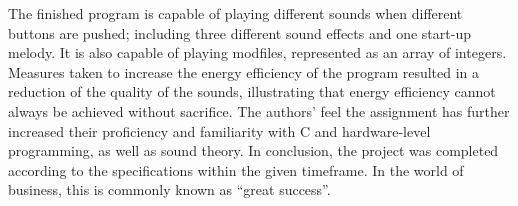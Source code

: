 The finished program is capable of playing different sounds when different buttons are pushed; including three different sound effects and one start-up melody.
It is also capable of playing modfiles, represented as an array of integers.
Measures taken to increase the energy efficiency of the program resulted in a reduction of the quality of the sounds, illustrating that energy efficiency cannot always be achieved without sacrifice.
The authors' feel the assignment has further increased their proficiency and familiarity with C and hardware-level programming, as well as sound theory.
In conclusion, the project was completed according to the specifications within the given timeframe.
In the world of business, this is commonly known as ``great success''.
